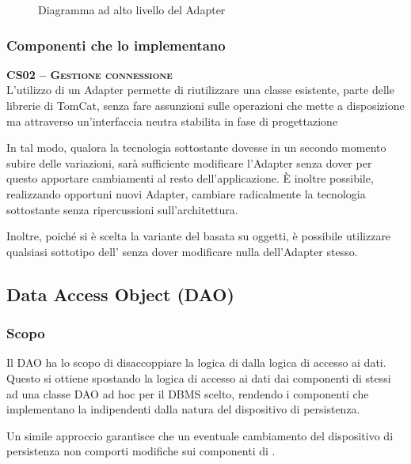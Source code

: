 \begin{figure}[H]
  \centering
  \caption{Diagramma ad alto livello del  Adapter}\label{fig:adapter}
\end{figure}

\subsubsection{Componenti che lo implementano}
\begin{description}
\item{\scshape\bfseries CS02 -- Gestione connessione}\\
L'utilizzo di un Adapter permette di riutilizzare una classe esistente, parte delle librerie di TomCat, senza fare assunzioni sulle operazioni che mette a disposizione ma attraverso un'interfaccia neutra stabilita in fase di progettazione

In tal modo, qualora la tecnologia sottostante dovesse in un secondo momento subire delle variazioni, sarà sufficiente modificare l'Adapter senza dover per questo apportare cambiamenti al resto dell'applicazione. È inoltre possibile, realizzando opportuni nuovi Adapter, cambiare radicalmente la tecnologia sottostante senza ripercussioni sull'architettura.

Inoltre, poiché si è scelta la variante del  basata su oggetti, è possibile utilizzare qualsiasi sottotipo dell' senza dover modificare nulla dell'Adapter stesso.
\end{description}

\subsection{Data Access Object (DAO)}

\subsubsection{Scopo}
Il  DAO ha lo scopo di disaccoppiare la logica di  dalla logica di accesso ai dati. Questo si ottiene spostando la logica di accesso ai dati dai componenti di  stessi ad una classe DAO ad hoc per il DBMS scelto, rendendo i componenti che implementano la  indipendenti dalla natura del dispositivo di persistenza.

Un simile approccio garantisce che un eventuale cambiamento del dispositivo di persistenza non comporti modifiche sui componenti di .

